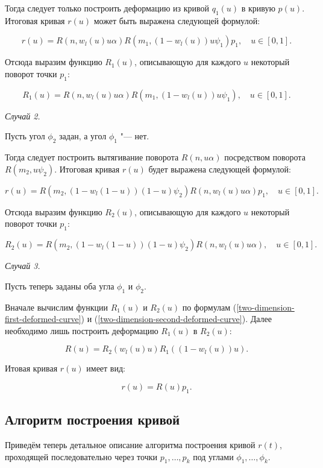 Тогда следует только построить деформацию из кривой $q_1(u)$ в кривую $p(u)$. Итоговая кривая $r(u)$ может быть
выражена следующей формулой:

$$
r(u)=R(n,w_l(u)u\alpha)R(m_1,(1-w_l(u))u\psi_1)p_1, \quad u \in [0,1].
$$

Отсюда выразим функцию $R_1(u)$, описывающую для каждого $u$ некоторый поворот точки $p_1$:

\begin{equation}
R_1(u)=R(n,w_l(u)u\alpha)R(m_1,(1-w_l(u))u\psi_1), \quad u \in [0,1].
\label{two-dimension-first-deformed-curve}
\end{equation}

\bigskip
\textit{Случай 2.}

Пусть угол $\phi_2$ задан, а угол $\phi_1$ "--- нет.

Тогда следует построить вытягивание поворота $R(n,u\alpha)$ посредством поворота $R(m_2,u\psi_2)$. Итоговая кривая
$r(u)$ будет выражена следующей формулой:

$$
r(u)=R(m_2,(1-w_l(1-u))(1-u)\psi_2)R(n,w_l(u)u\alpha)p_1, \quad u \in [0,1].
$$

Отсюда выразим функцию $R_2(u)$, описывающую для каждого $u$ некоторый поворот точки $p_1$:

\begin{equation}
R_2(u)=R(m_2,(1-w_l(1-u))(1-u)\psi_2)R(n,w_l(u)u\alpha), \quad u \in [0,1].
\label{two-dimension-second-deformed-curve}
\end{equation}

\bigskip
\textit{Случай 3.}

Пусть теперь заданы оба угла $\phi_1$ и $\phi_2$.

Вначале вычислим функции $R_1(u)$ и $R_2(u)$ по формулам (\ref{two-dimension-first-deformed-curve}) и
(\ref{two-dimension-second-deformed-curve}). Далее необходимо лишь построить деформацию $R_1(u)$ в $R_2(u)$:

$$
R(u)=R_2(w_l(u)u)R_1((1-w_l(u))u).
$$

Итовая кривая $r(u)$ имеет вид:

$$
r(u)=R(u)p_1.
$$

\subsection*{Алгоритм построения кривой}

Приведём теперь детальное описание алгоритма построения кривой $r(t)$, проходящей последовательно через точки
$p_1,\dots,p_k$ под углами $\phi_1,\dots,\phi_k$.

